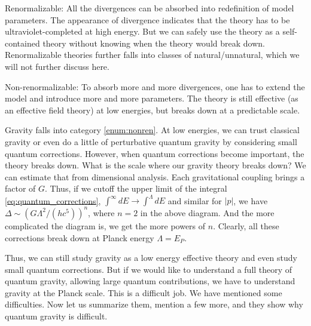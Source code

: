 {{        \item Renormalizable: All the divergences can be absorbed into redefinition of model parameters. The appearance of divergence indicates that the theory has to be ultraviolet-completed at high energy. But we can safely use the theory as a self-contained theory without knowing when the theory would break down. Renormalizable theories further falls into classes of natural/unnatural, which we will not further discuss here.
        \item Non-renormalizable: To absorb more and more divergences, one has to extend the model and introduce more and more parameters. The theory is still effective (as an effective field theory) at low energies, but breaks down at a predictable scale. \label{enum:nonren}
    }
    \tcblower
    Gravity falls into category \ref{enum:nonren}. At low energies, we can trust classical gravity or even do a little of perturbative quantum gravity by considering small quantum corrections. However, when quantum corrections become important, the theory breaks down. What is the scale where our gravity theory breaks down? We can estimate that from dimensional analysis. Each gravitational coupling brings a factor of $G$. Thus, if we cutoff the upper limit of the integral \eqref{eq:quantum_corrections}, $\int^\infty dE \rightarrow \int^\Lambda dE$ and similar for $|p|$, we have $\Delta \sim (G\Lambda^2/(hc^5))^n$, where $n=2$ in the above diagram. And the more complicated the diagram is, we get the more powers of $n$. Clearly, all these corrections break down at Planck energy $\Lambda = E_P$.
}

Thus, we can still study gravity as a low energy effective theory and even study small quantum corrections. But if we would like to understand a full theory of quantum gravity, allowing large quantum contributions, we have to understand gravity at the Planck scale. This is a difficult job. We have mentioned some difficulties. Now let us summarize them, mention a few more, and they show why quantum gravity is difficult.

